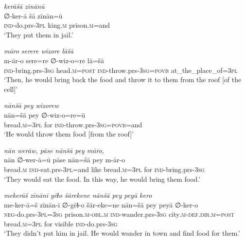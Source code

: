 \ea \label{BP.142}
\textit{kerāšā zīnānū} \\ 
\gll ∅-ker-ā šā zīnān=ū \\ 
 \textsc{ind-}do.prs\textsc{-3pl} king\textsc{.m} prison\textsc{.m}=and \\ 
\glt `They put them in jail.'
\z 
 
\ea \label{BP.145}
\textit{māro serere wizore lāšā} \\ 
\gll m-ār-o sere=re ∅-wiz-o=re lā=šā \\ 
 \textsc{ind-}bring.prs\textsc{-3sg} head\textsc{.m}\textsc{=\textsc{post}} \textsc{ind-}throw.prs\textsc{-3sg}\textsc{=\textsc{povb}} at\_the\_place\_of\textsc{=3pl} \\ 
\glt `Then, he would bring back the food and throw it to them from the roof [of the cell]'
\z 
 
\ea \label{BP.146}
\textit{nānšā pey wizorew} \\ 
\gll nān=šā pey ∅-wiz-o=re=ū \\ 
 bread\textsc{.m}\textsc{=3pl} for \textsc{ind-}throw.prs\textsc{-3sg}\textsc{=\textsc{povb}}=and \\ 
\glt `He would throw them food [from the roof]'
\z 
 
\ea \label{BP.147}
\textit{nān werāw, pāse nānšā pey māro,} \\ 
\gll nān ∅-wer-ā=ū pāse nān=šā pey m-ār-o \\ 
 bread\textsc{.m} \textsc{ind-}eat.prs\textsc{-3pl}=and like bread\textsc{.m}\textsc{=3pl} for \textsc{ind-}bring.prs\textsc{-3sg} \\ 
\glt `They would eat the food. In this way, he would bring them food.'
\z 
 
\ea \label{BP.148}
\textit{mekerāš zīnānī gēɫo šārekene nānšā pey peyā kero} \\ 
\gll me-ker-ā=š zīnān-ī ∅-gēɫ-o šār-eke=ne nān=šā pey peyā ∅-ker-o \\ 
 \textsc{neg-}do.prs\textsc{-3pl}\textsc{=3sg} prison\textsc{.m}\textsc{-obl}\textsc{.m} \textsc{ind-}wander.prs\textsc{-3sg} city\textsc{.m}\textsc{-def}\textsc{.dir}\textsc{.m}\textsc{=\textsc{post}} bread\textsc{.m}\textsc{=3pl} for visible \textsc{ind-}do.prs\textsc{-3sg} \\ 
\glt `They didn’t put him in jail. He would wander in town and find food for them.'
\z 
 
